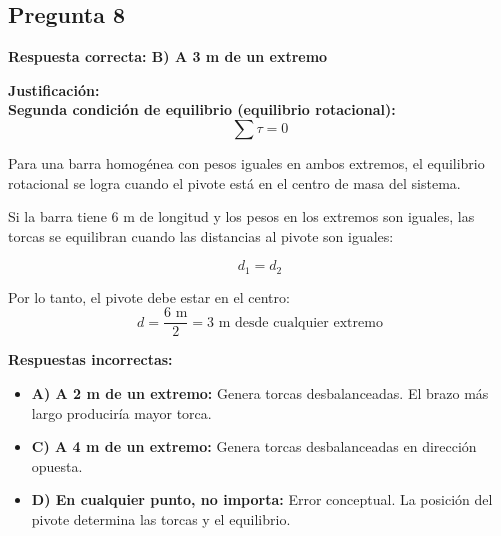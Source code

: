 \begin{respuestabox}

\subsection{Pregunta 8}
\textcolor{verdecorrecto}{\textbf{Respuesta correcta: B) A 3 m de un extremo}}

\textbf{Justificación:}\\
\textbf{Segunda condición de equilibrio (equilibrio rotacional):}
$$\sum \tau = 0$$

Para una barra homogénea con pesos iguales en ambos extremos, el equilibrio rotacional se logra cuando el pivote está en el centro de masa del sistema.

Si la barra tiene 6 m de longitud y los pesos en los extremos son iguales, las torcas se equilibran cuando las distancias al pivote son iguales:

$$d_1 = d_2$$

Por lo tanto, el pivote debe estar en el centro:
$$d = \frac{6 \text{ m}}{2} = 3 \text{ m desde cualquier extremo}$$

\textbf{Respuestas incorrectas:}
\begin{itemize}
    \item \textbf{A) A 2 m de un extremo:} Genera torcas desbalanceadas. El brazo más largo produciría mayor torca.
    \item \textbf{C) A 4 m de un extremo:} Genera torcas desbalanceadas en dirección opuesta.
    \item \textbf{D) En cualquier punto, no importa:} Error conceptual. La posición del pivote determina las torcas y el equilibrio.
\end{itemize}
\end{respuestabox}
\newpage
